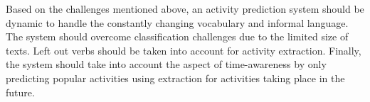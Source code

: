 Based on the challenges mentioned above, an activity prediction system should be dynamic to handle the constantly changing vocabulary and informal language. The system should overcome classification challenges due to the limited size of texts. Left out verbs should be taken into account for activity extraction. Finally, the system should take into account the aspect of time-awareness by only predicting popular activities using extraction for activities taking place in the future.
\fi



